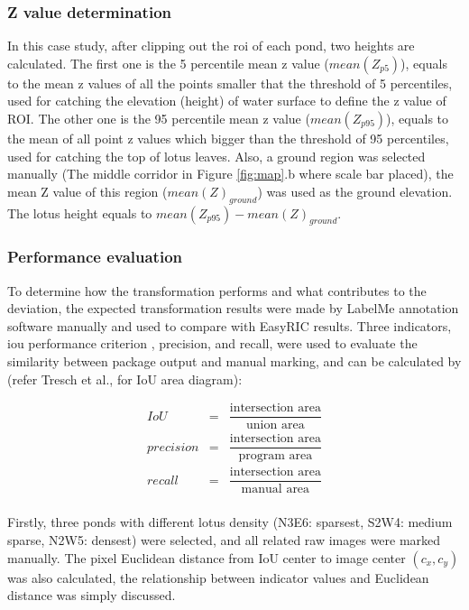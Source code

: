 \documentclass{configs/bmcart}
\begin{document}
\subsubsection*{Z value determination}
In this case study, after clipping out the \acrfull*{roi} of each pond, two heights are calculated. The first one is the 5 percentile mean z value ($mean(Z_{p5})$), equals to the mean z values of all the points smaller that the threshold of 5 percentiles, used for catching the elevation (height) of water surface to define the z value of ROI. The other one is the 95 percentile mean z value ($mean(Z_{p95})$), equals to the mean of all point z values which bigger than the threshold of 95 percentiles, used for catching the top of lotus leaves. Also, a ground region was selected manually (The middle corridor in Figure \ref{fig:map}.b where scale bar placed), the mean Z value of this region ($mean(Z)_{ground}$) was used as the ground elevation. The lotus height equals to $mean(Z_{p95}) - mean(Z)_{ground}$.

\subsubsection*{Performance evaluation}
To determine how the transformation performs and what contributes to the deviation, the expected transformation results were made by LabelMe annotation software manually and used to compare with EasyRIC results. Three indicators, \acrfull*{iou} performance criterion \cite{everingham_pascal_2010}, precision, and recall, were used to evaluate the similarity between package output and manual marking, and can be calculated by (refer Tresch et al., \cite{tresch_easympe_2019} for IoU area diagram): 

$$
\begin{array}{lcl}
  IoU & = & \dfrac{\text{intersection area}}{\text{union area}} \\
  precision & = & \dfrac{\text{intersection area}}{\text{program area}} \\
  recall & = & \dfrac{\text{intersection area}}{\text{manual area}} \\
\end{array}
$$

Firstly, three ponds with different lotus density (N3E6: sparsest, S2W4: medium sparse, N2W5: densest) were selected, and all related raw images were marked manually. The pixel Euclidean distance from IoU center to image center $(c_x, c_y)$ was also calculated, the relationship between indicator values and Euclidean distance was simply discussed.
\end{document}
